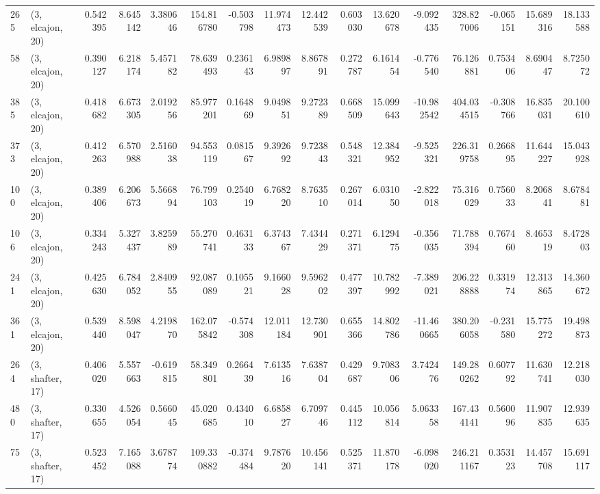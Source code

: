\begin{tabular}{llrrrrrrrrrrrrrr}
265 &  (3, elcajon, 20) &   0.542395 &   8.645142 &   3.380646 &   154.816780 &  -0.503798 &  11.974473 &  12.442539 &  0.603030 &  13.620678 &  -9.092435 &   328.827006 & -0.065151 &  15.689316 &  18.133588 \\
58  &  (3, elcajon, 20) &   0.390127 &   6.218174 &   5.457182 &    78.639493 &   0.236143 &   6.989897 &   8.867891 &  0.272787 &   6.161454 &  -0.776540 &    76.126881 &  0.753406 &   8.690447 &   8.725072 \\
385 &  (3, elcajon, 20) &   0.418682 &   6.673305 &   2.019256 &    85.977201 &   0.164869 &   9.049851 &   9.272389 &  0.668509 &  15.099643 & -10.982542 &   404.034515 & -0.308766 &  16.835031 &  20.100610 \\
373 &  (3, elcajon, 20) &   0.412263 &   6.570988 &   2.516038 &    94.553119 &   0.081567 &   9.392692 &   9.723843 &  0.548321 &  12.384952 &  -9.525321 &   226.319758 &  0.266895 &  11.644227 &  15.043928 \\
100 &  (3, elcajon, 20) &   0.389406 &   6.206673 &   5.566894 &    76.799103 &   0.254019 &   6.768220 &   8.763510 &  0.267014 &   6.031050 &  -2.822018 &    75.316029 &  0.756033 &   8.206841 &   8.678481 \\
106 &  (3, elcajon, 20) &   0.334243 &   5.327437 &   3.825989 &    55.270741 &   0.463133 &   6.374367 &   7.434429 &  0.271371 &   6.129475 &  -0.356035 &    71.788394 &  0.767460 &   8.465319 &   8.472803 \\
241 &  (3, elcajon, 20) &   0.425630 &   6.784052 &   2.840955 &    92.087089 &   0.105521 &   9.166028 &   9.596202 &  0.477397 &  10.782992 &  -7.389021 &   206.228888 &  0.331974 &  12.313865 &  14.360672 \\
361 &  (3, elcajon, 20) &   0.539440 &   8.598047 &   4.219870 &   162.075842 &  -0.574308 &  12.011184 &  12.730901 &  0.655366 &  14.802786 & -11.460665 &   380.206058 & -0.231580 &  15.775272 &  19.498873 \\
264 &  (3, shafter, 17) &   0.406020 &   5.557663 &  -0.619815 &    58.349801 &   0.266439 &   7.613516 &   7.638704 &  0.429687 &   9.708306 &   3.742476 &   149.280262 &  0.607792 &  11.630741 &  12.218030 \\
480 &  (3, shafter, 17) &   0.330655 &   4.526054 &   0.566045 &    45.020685 &   0.434010 &   6.685827 &   6.709746 &  0.445112 &  10.056814 &   5.063358 &   167.434141 &  0.560096 &  11.907835 &  12.939635 \\
75  &  (3, shafter, 17) &   0.523452 &   7.165088 &   3.678774 &   109.330882 &  -0.374484 &   9.787620 &  10.456141 &  0.525371 &  11.870178 &  -6.098020 &   246.211167 &  0.353123 &  14.457708 &  15.691117 \\

\end{tabular}
